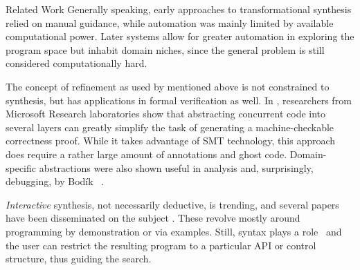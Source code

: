 \begin{paragraph}{Related Work}
Generally speaking, early approaches to transformational synthesis relied on
manual guidance, while automation was mainly limited by available computational
power. Later systems allow for greater automation in exploring the program space
but inhabit domain niches, since the general problem is still considered computationally hard.

The concept of refinement as used by \cite{TPHOLs1996/Butler,POPL2015/Delaware} mentioned above
is not constrained to synthesis, but has applications in formal verification
as well. In \cite{CAV2015/Hawblitzel}, researchers from Microsoft Research laboratories
show that abstracting concurrent code into several layers can greatly simplify the task of generating
a machine-checkable correctness proof.
While it takes advantage of SMT technology, this approach does require a rather
large amount of annotations and ghost code.
Domain-specific abstractions were also shown useful in analysis and,
surprisingly, debugging, by Bod\'ik \etal~\cite{SNAPL2107/Bodik}.

\emph{Interactive} synthesis, not necessarily deductive,
is trending, and several papers have been disseminated on the subject
\cite{SYNASC2012/Gulwani,CACM2012/Gulwani,CAV2011/Gvero,Onward2015/Barman}.
These revolve mostly around programming by demonstration or via examples.
Still, syntax plays a role~\cite{NATOSec2015/Alur} and the user can restrict the resulting program
to a particular API or control structure, thus guiding the search.
\end{paragraph}
